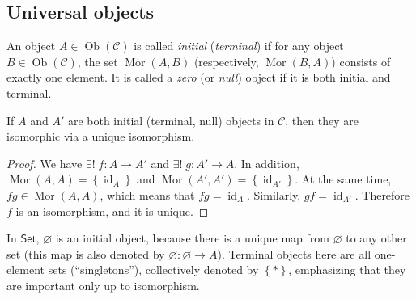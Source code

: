 \documentclass[english,letterpaper]{article}%
\numberwithin{equation}{section}
\numberwithin{figure}{section}
\numberwithin{table}{section}
\theoremstyle{definition}
\theoremstyle{definition}
\theoremstyle{definition}
\theoremstyle{plain}
\theoremstyle{plain}
\theoremstyle{plain}
\theoremstyle{plain}
\theoremstyle{remark}
\theoremstyle{remark}
\def\red{\color{red}}
\DeclareMathOperator{\mor}{Mor}
\DeclareMathOperator{\id}{id}
\DeclareMathOperator{\ob}{Ob}
\newcommand{\PRLsep}{   %
           \noindent\makebox[\linewidth]{
                \resizebox{0.5\linewidth}{1pt}{$\blacklozenge$}}}
\begin{document}

\subsection{Universal objects}
\begin{defn}
 An object $A\in\ob\left(\mathcal{C}\right)$ is called \emph{initial}
(\emph{terminal}) if for any object $B\in\ob\left(\mathcal{C}\right)$,
the set $\mor\left(A,B\right)$ (respectively, $\mor\left(B,A\right)$)
consists of exactly one element. It is called a \emph{zero} (or
\emph{null}) object if it is both initial and terminal.
\end{defn}
\begin{prop}
If $A$ and $A'$ are both initial (terminal, null) objects in $\mathcal{C}$,
then they are isomorphic via a unique isomorphism.
\end{prop}
\begin{proof}
We have $\exists!\;f:A\to A'$ and $\exists!\;g:A'\to A$. In addition,
$\mor\left(A,A\right)=\left\{ \id_{A}\right\} $ and $\mor\left(A',A'\right)=\left\{ \id_{A'}\right\} $.
At the same time, $fg\in\mor\left(A,A\right)$, which means that $fg=\id_{A}$.
Similarly, $gf=\id_{A'}$. Therefore $f$ is an isomorphism, and it
is unique.
\end{proof}
\begin{example}
In $\mathsf{Set}$, $\varnothing$ is an initial object, because there
is a unique map from $\varnothing$ to any other set (this map is
also denoted by $\varnothing:\varnothing\to A$). Terminal objects
here are all one-element sets (``singletons''), collectively denoted
by $\left\{ \ast\right\} $, emphasizing that they are important only
up to isomorphism.
\end{example}
\end{document}
